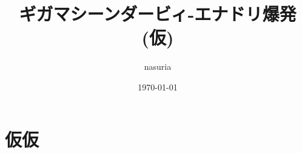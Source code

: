 \documentclass{jsarticle}
\begin{document}
\title{ギガマシーンダービィ-エナドリ爆発 (仮)}
\author{nasuria}
\date{\today}
\maketitle
\newpage

\section{仮仮}
\end{document}
